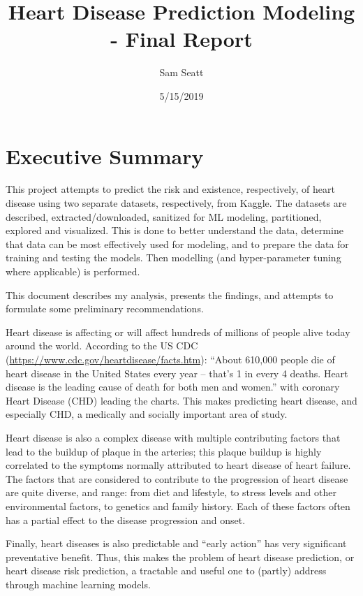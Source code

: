 \documentclass[]{article}
\title{Heart Disease Prediction Modeling - Final Report}
\author{Sam Seatt}
\date{5/15/2019}
\begin{document}
\maketitle

\section{Executive Summary}\label{executive-summary}

This project attempts to predict the risk and existence, respectively,
of heart disease using two separate datasets, respectively, from Kaggle.
The datasets are described, extracted/downloaded, sanitized for ML
modeling, partitioned, explored and visualized. This is done to better
understand the data, determine that data can be most effectively used
for modeling, and to prepare the data for training and testing the
models. Then modelling (and hyper-parameter tuning where applicable) is
performed.

This document describes my analysis, presents the findings, and attempts
to formulate some preliminary recommendations.

Heart disease is affecting or will affect hundreds of millions of people
alive today around the world. According to the US CDC
(\url{https://www.cdc.gov/heartdisease/facts.htm}): ``About 610,000
people die of heart disease in the United States every year -- that's 1
in every 4 deaths. Heart disease is the leading cause of death for both
men and women.'' with coronary Heart Disease (CHD) leading the charts.
This makes predicting heart disease, and especially CHD, a medically and
socially important area of study.

Heart disease is also a complex disease with multiple contributing
factors that lead to the buildup of plaque in the arteries; this plaque
buildup is highly correlated to the symptoms normally attributed to
heart disease of heart failure. The factors that are considered to
contribute to the progression of heart disease are quite diverse, and
range: from diet and lifestyle, to stress levels and other environmental
factors, to genetics and family history. Each of these factors often has
a partial effect to the disease progression and onset.

Finally, heart diseases is also predictable and ``early action'' has
very significant preventative benefit. Thus, this makes the problem of
heart disease prediction, or heart disease risk prediction, a tractable
and useful one to (partly) address through machine learning models.
\end{document}
